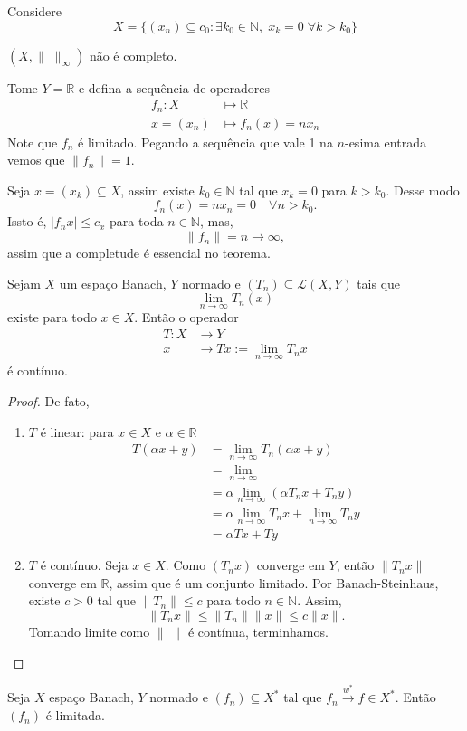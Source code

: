\documentclass[portuguese]{article}
\theoremstyle{definition}
\newcommand{\R}{\mathbb{R}}
\newcommand{\N}{\mathbb{N}}
\begin{document}
	\begin{exemplo}
		Considere
		\[X=\{(x_n)\subseteq c_0:\exists k_0\in\N,\; x_k=0\;\forall k>k_0\}\]
		\begin{exer*}
			$(X,\|\;\|_\infty)$ não é completo.
		\end{exer*}
		Tome $Y=\R$ e defina a sequência de operadores
		\begin{align*}
			f_n:X&\mapsto\R\\
			x=(x_n)&\mapsto f_n(x)=nx_n
		\end{align*}
		Note que $f_n$ é limitado. Pegando a sequência que vale 1 na $n$-esima entrada vemos que $\| f_n\|=1$.
		
		Seja $x=(x_k)\subseteq X$, assim existe $k_0\in\N$ tal que $x_k=0$ para $k>k_0$. Desse modo
		\[f_n(x)=nx_n=0\quad\forall n>k_0.\]
		Issto é, $|f_nx|\leq c_x$ para toda $n\in\N$, mas,
		\[\| f_n\|=n\to\infty,\]
		assim que a completude é essencial no teorema.
	\end{exemplo}
	\begin{coro}
		Sejam $X$ um espaço Banach, $Y$ normado e $(T_n)\subseteq\mathcal{L}(X,Y)$ tais que
		\[\lim_{n\to\infty}T_n(x)\]
		existe para todo $x\in X$. Então o operador 
		\begin{align*}
			T:X&\to Y\\
			x&\to Tx:=\lim_{n\to \infty}T_nx
		\end{align*}
		é contínuo.
	\end{coro}
	\begin{proof}
		De fato,
		\begin{enumerate}
			\item $T$ é linear: para $x\in X$ e $\alpha\in\R$
			\begin{align*}
				T(\alpha x+y)&=\lim_{n\to \infty}T_n(\alpha x+y)\\
				&=\lim_{n\to\infty} \\
				&=\alpha\lim_{n\to\infty}(\alpha T_nx+T_ny)\\
				&=\alpha\lim_{n\to \infty}T_nx+\lim_{n\to \infty}T_ny\\
				&=\alpha Tx+Ty
			\end{align*}
			\item $T$ é contínuo. Seja $x\in X$. Como $(T_nx)$ converge em $Y$, então $\| T_nx\|$ converge em $\R$, assim que é um conjunto limitado. Por Banach-Steinhaus, existe $c>0$ tal que $\| T_n\|\leq c$ para todo $n\in\N$. Assim,
			\[\| T_nx\|\leq\| T_n\|\| x\|\leq c\| x\|.\]
			Tomando limite como $\|\;\|$ é contínua, terminhamos.
		\end{enumerate}
	\end{proof}
	\begin{coro}
		Seja $X$ espaço Banach, $Y$ normado e $(f_n)\subseteq X^*$ tal que $f_n\overset{w^*}{\longrightarrow}f\in X^*$. Então $(f_n)$ é limitada.
	\end{coro}
	
\end{document}
